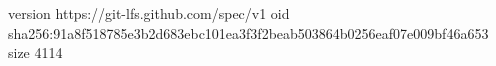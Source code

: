 version https://git-lfs.github.com/spec/v1
oid sha256:91a8f518785e3b2d683ebc101ea3f3f2beab503864b0256eaf07e009bf46a653
size 4114
